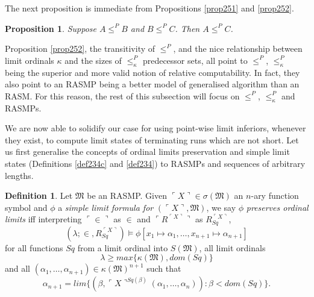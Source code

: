 \documentclass[12pt, twoside]{memoir}
\numberwithin{equation}{section}
\newtheorem{prop}[thm]{Proposition}
\theoremstyle{definition}
\newtheorem{defi}[thm]{Definition}
\theoremstyle{remark}
\theoremstyle{definition}
\theoremstyle{definition}
\theoremstyle{definition}
\theoremstyle{remark}
\begin{document}
The next proposition is immediate from Propositions \ref{prop251} and \ref{prop252}.

\begin{prop}
Suppose $A \leq^P B$ and $B \leq^P C$. Then $A \leq^P C$.
\end{prop} 

Proposition \ref{prop252}, the transitivity of $\leq^P$, and the nice relationship between limit ordinals $\kappa$ and the sizes of $\leq^P_{\kappa}$ predecessor sets, all point to $\leq^P$, $\leq^P_{\kappa}$ being the superior and more valid notion of relative computability. In fact, they also point to an RASMP being a better model of generalised algorithm than an RASM. For this reason, the rest of this subsection will focus on $\leq^P$, $\leq^P_{\kappa}$ and RASMPs.

We are now able to solidify our case for using point-wise limit inferiors, whenever they exist, to compute limit states of terminating runs which are not short. Let us first generalise the concepts of ordinal limits preservation and simple limit states (Definitions \ref{def234c} and \ref{def234}) to RASMPs and sequences of arbitrary lengths.

\begin{defi}\label{257c}
Let $\mathfrak{M}$ be an RASMP. Given $\ulcorner X \urcorner \in \sigma(\mathfrak{M})$ an $n$-ary function symbol and $\phi$ a \emph{simple limit formula for} $(\ulcorner X \urcorner, \mathfrak{M})$, we say $\phi$ \emph{preserves ordinal limits} iff interpreting $\ulcorner \in \urcorner$ as $\in$ and $\ulcorner R^{\ulcorner X \urcorner} \urcorner$ as $R_{Sq}^{\ulcorner X \urcorner}$, 
\begin{equation*}
    (\lambda; \in, R_{Sq}^{\ulcorner X \urcorner}) \models \phi[x_1 \mapsto \alpha_1, \dots, x_{n+1} \mapsto \alpha_{n+1}]
\end{equation*}
for all functions $Sq$ from a limit ordinal into $S(\mathfrak{M})$, all limit ordinals 
\begin{equation*}
    \lambda \geq max\{\kappa(\mathfrak{M}), dom(Sq)\}
\end{equation*}
and all $(\alpha_1, \dots, \alpha_{n+1}) \in \kappa(\mathfrak{M})^{n+1}$ such that 
\begin{equation*}
    \alpha_{n+1} = lim \{(\beta, \ulcorner X \urcorner^{Sq(\beta)}(\alpha_1, \dots, \alpha_n)) : \beta < dom(Sq)\} \text{.}
\end{equation*}
\end{defi}
\end{document}
